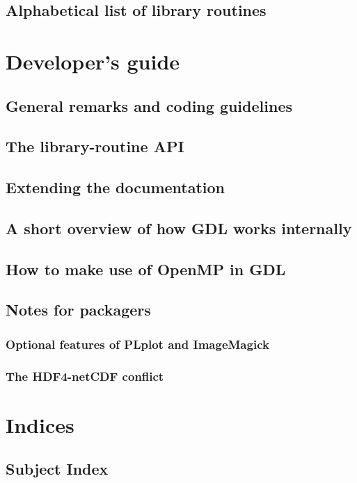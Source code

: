 \documentclass[10pt,titleauthor,openany]{mwbk}
\begin{document}
  \onecolumn
  \chapter{Alphabetical list of library routines}
  {
    \secondarysize
    \begin{multicols}{2}{}
    \end{multicols}
  }

  \part{Developer's guide}
  \twocolumn

  \chapter{General remarks and coding guidelines}
  
 
  \chapter{The library-routine API}
  

  \chapter{Extending the documentation}
  
  \chapter{A short overview of how GDL works internally}
  

  \chapter{How to make use of OpenMP in GDL}
 
  \chapter{Notes for packagers}
  \section{Optional features of PLplot and ImageMagick}
  \section{The HDF4-netCDF conflict}

  \part{Indices}
  \onecolumn
  \appendix
  \secondarysize
  \chapter*{Subject Index}
  \begin{multicols}{3}{\printindex}
  \end{multicols}

  \twocolumn
  
\end{document}
